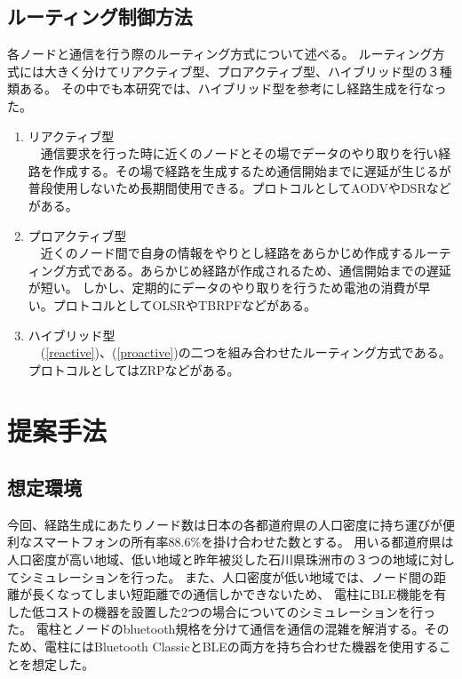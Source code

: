 \documentclass[a4paper, 10pt]{ltjsarticle}
\begin{document}
\subsection{ルーティング制御方法}
各ノードと通信を行う際のルーティング方式について述べる。
ルーティング方式には大きく分けてリアクティブ型、プロアクティブ型、ハイブリッド型の３種類ある。
その中でも本研究では、ハイブリッド型を参考にし経路生成を行なった。
\begin{enumerate}
  \item \label{reactive} リアクティブ型\\　通信要求を行った時に近くのノードとその場でデータのやり取りを行い経路を作成する。その場で経路を生成するため通信開始までに遅延が生じるが普段使用しないため長期間使用できる。プロトコルとしてAODVやDSRなどがある。
  \item \label{proactive} プロアクティブ型\\　近くのノード間で自身の情報をやりとし経路をあらかじめ作成するルーティング方式である。あらかじめ経路が作成されるため、通信開始までの遅延が短い。
  しかし、定期的にデータのやり取りを行うため電池の消費が早い。プロトコルとしてOLSRやTBRPFなどがある。
  \item ハイブリッド型\\　(\ref{reactive})、(\ref{proactive})の二つを組み合わせたルーティング方式である。プロトコルとしてはZRPなどがある。
\end{enumerate}

\section{提案手法}
\subsection{想定環境}
今回、経路生成にあたりノード数は日本の各都道府県の人口密度に持ち運びが便利なスマートフォンの所有率88.6\%\cite{スマホ保有率}を掛け合わせた数とする。%
用いる都道府県は人口密度が高い地域、低い地域と昨年被災した石川県珠洲市の３つの地域に対してシミュレーションを行った。
また、人口密度が低い地域では、ノード間の距離が長くなってしまい短距離での通信しかできないため、
電柱にBLE機能を有した低コストの機器を設置した2つの場合についてのシミュレーションを行った。
電柱とノードのbluetooth規格を分けて通信を通信の混雑を解消する。そのため、電柱にはBluetooth ClassicとBLEの両方を持ち合わせた機器を使用することを想定した。
\end{document}
